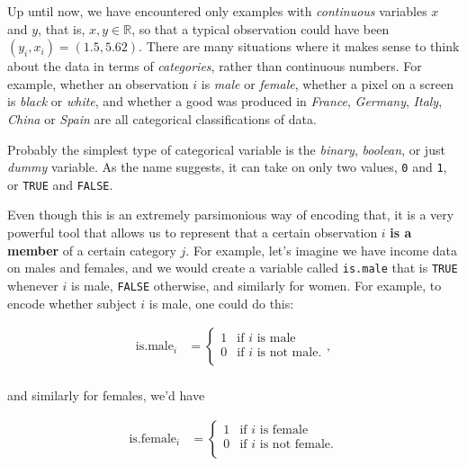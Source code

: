 \documentclass[]{book}
\theoremstyle{definition}
\theoremstyle{definition}
\theoremstyle{definition}
\theoremstyle{remark}
\begin{document}
Up until now, we have encountered only examples with \emph{continuous}
variables \(x\) and \(y\), that is, \(x,y \in \mathbb{R}\), so that a
typical observation could have been \((y_i,x_i) = (1.5,5.62)\). There
are many situations where it makes sense to think about the data in
terms of \emph{categories}, rather than continuous numbers. For example,
whether an observation \(i\) is \emph{male} or \emph{female}, whether a
pixel on a screen is \emph{black} or \emph{white}, and whether a good
was produced in \emph{France}, \emph{Germany}, \emph{Italy},
\emph{China} or \emph{Spain} are all categorical classifications of
data.

Probably the simplest type of categorical variable is the \emph{binary},
\emph{boolean}, or just \emph{dummy} variable. As the name suggests, it
can take on only two values, \texttt{0} and \texttt{1}, or \texttt{TRUE}
and \texttt{FALSE}.

Even though this is an extremely parsimonious way of encoding that, it
is a very powerful tool that allows us to represent that a certain
observation \(i\) \textbf{is a member} of a certain category \(j\). For
example, let's imagine we have income data on males and females, and we
would create a variable called \texttt{is.male} that is \texttt{TRUE}
whenever \(i\) is male, \texttt{FALSE} otherwise, and similarly for
women. For example, to encode whether subject \(i\) is male, one could
do this:

\begin{align*}
\text{is.male}_i &=  \begin{cases}
                    1 & \text{if }i\text{ is male} \\
                    0 & \text{if }i\text{ is not male}. \\
                 \end{cases}, \\
\end{align*}

and similarly for females, we'd have

\begin{align*}
\text{is.female}_i &=  \begin{cases}
                    1 & \text{if }i\text{ is female} \\
                    0 & \text{if }i\text{ is not female}. \\
                 \end{cases} \\
\end{align*}
\end{document}
